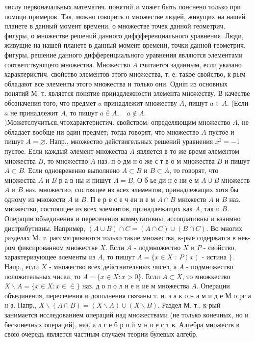 \documentclass[10pt]{article}
\begin{document}
числу первоначальных математич. понятий и может быть понснено только при помоци примеров. Так, можно говорить о множестве людей, живущих на нашей планете в данный момент времени, о множестве точек данной геометрич. фигуры, о множестве решений данного диффференциального уравнения. Люди, живущие на нашей планете в данный момент времени, точки данной геометрич. фигуры, решение данного дифференциального уравнения являются элементами соответствующего множества. Множество $A$ считается заданным, если указано характеристич. свойство элементов этого множества, т. е. такое свойство, к-рым обладают все элементы этого множества и только они. Одніп из основных понятий М. т. является понятие принадлежности элемента множеству. В качестве обозначения того, что предмет $a$ принадлежит множеству $A$, пишут $a \in A$. (Если $a$ не принадлежит $A$, то пишут $a \bar{\in} A, \quad a \notin A$.$) Может случиться, что характеристич.$ свойством, определяющим множество $A$, не обладает вообще ни один предмет; тогда говорят, что множество $A$ пустое и пишут $A=\varnothing$. Напр., множество действигельных решений уравнения $x^{2}=-1$ пустое. Если каждый әлемент множества $A$ является в то же время әлементом множества $B$, то множество $A$ наз. п о дм н о же с т в о м множества $B$ и пишут $A \subset B$. Если одноврекенно выполнено $A \subset B$ и $B \subset A$, то говорят, что множества $A$ и $B$ р а в ны и пишут $A=B$. О б ье ди н е ни е м $A \cup B$ множеств $A$ и $B$ наз. множество, состоящее из всех элементов, принадлежащих хотя бы одному из множеств $A$ и $B$. П е р е с е ч ен и е м $A \cap B$ множеств $A$ и $B$ наз. множество, состояпцее из всех элементов, принадлежащих как $A$, так и $B$. Операции объединения и пересечения коммутативны, ассоциативны и взаимно дистрибутивны. Например, $(A \cup B) \cap C=(A \cap C) \cup(B \cap C)$. Во многих разделах М. т. рассматриваются только такие множества, к-рые содержатся в нек-ром фиксированном множестве $X$. Если $A$ - подмножество $X$ и $P$ - свойство, характеризующее әлементы из $A$, то пишут $A=\{x \in X$ : $P(x)$ - истина $\}$. Напр., если $X$ - множество всех действительных чисел, а $A$ - подмножество положительных чисел, то $A=\{x \in X: x>0\}$. Если $A \subset X$, то множкество $X \backslash A=\{x \in X: x \in \bar{\in}\}$ наз. д о п о л н е н ие м множества $A$. Операции объединения, пересечения и дополнения связаны т. н. з а к о н а м и д е М о рг а н а. Напр., $X \backslash(A \cap B)=(X \backslash A) \cup(X \backslash B)$. Раздел М. т., к-рый занимается исследованием операций над множествами (не только конечных, но и бесконечных операций), наз. а л г е б р о й м н о е с т в. Алгебра множеств в свою очередь является частным случаем теории булевых алгебр.
\end{document}
